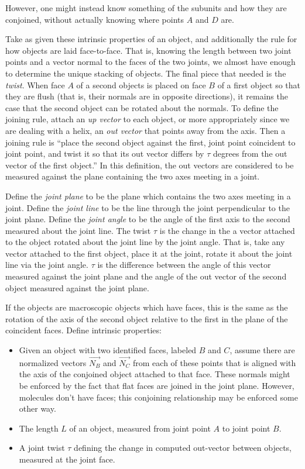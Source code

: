 \documentclass[11pt]{article}
\begin{document}
{However, one might instead know something of the subunits and
how they are conjoined, without actually knowing where points $A$
and $D$ are.

Take as given these intrinsic properties of an object, and additionally the
rule for how objects are laid face-to-face. That is, knowing the length between two
joint points and a vector normal to the faces of the two joints, we almost have
enough to determine the unique stacking of objects. The final piece
that needed is
the {\em twist}. When face $A$ of a second objects is placed on face $B$
of a first object so that they are flush (that is, their normals are in opposite directions),
it remains the case that the second object can be rotated about the normals. To
define the joining rule, attach an {\em up vector} to each object, or more appropriately
since we are dealing with a helix, an {\em out vector} that points away from the axis.
Then a joining
rule is ``place the second object against the first, joint point coincident to joint point,
and twist it so that its out vector differs by $\tau$ degrees from the out vector of the first
object.'' In this definition, the out vectors are considered to be measured against the plane
containing the two axes meeting in a joint.

Define the {\em joint plane} to be the plane which contains the two axes meeting in a joint.
Define the {\em joint line} to be the line through the joint perpendicular to the joint plane.
Define the {\em joint angle} to be the angle of the first axis to the second measured about
the joint line.
The twist $\tau$ is the change in the a vector attached to the object rotated about the joint
line by the joint angle. That is, take any vector attached to the first object, place it at
the joint, rotate it about the joint line via the joint angle. $\tau$ is the difference
between the angle of this vector measured against the joint plane and the angle of the
out vector of the second object measured against the joint plane.

If the objects are macroscopic objects which have faces, this is the same as the rotation
of the axis of the second object relative to the first in the plane of the coincident faces.
Define intrinsic properties:

\begin{itemize}
\item Given an object with two identified faces, labeled $B$ and $C$, assume there are normalized
  vectors $\overrightarrow{N_B}$ and $\overrightarrow{N_C}$
  from each of these points that is aligned with the axis of the conjoined object attached to
  that face. These normals might be enforced by the fact that flat faces are joined in the joint plane.
  However, molecules don't have faces; this conjoining relationship may be enforced some other way.
\item The length $L$ of an object, measured from joint point $A$ to joint point $B$.
\item A joint twist $\tau$ defining the change in computed out-vector between objects,
  measured at the joint face.
\end{itemize}

}
\end{document}
